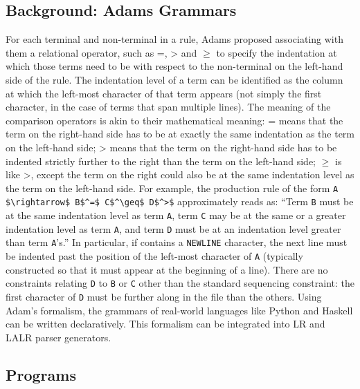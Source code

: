 \subsection{Background: Adams Grammars}
For each terminal and non-terminal in a rule, Adams proposed associating with them a relational operator, such as =, > and $\geq$ to specify the indentation at which those terms need to be with respect to the non-terminal on the left-hand side of the rule. The indentation level of a term can be identified as the column at which the left-most character of that term appears (not simply the first character, in the case of terms that span multiple lines). The meaning of the comparison operators is akin to their mathematical meaning: = means that the term on the right-hand side has to be at exactly the same indentation as the term on the left-hand side; >  means that the term on the right-hand side has to be indented strictly further to the right than the term on the left-hand side; $\geq$ is like >, except the term on the right could also be at the same indentation level as the term on the left-hand side. For example, the production rule of the form \lstinline{A $\rightarrow$ B$^=$ C$^\geq$ D$^>$} approximately reads as: ``Term \lstinline{B} must be at the same indentation level as term \lstinline{A}, term \lstinline{C} may be at the same or a greater indentation level as term \lstinline{A}, and term \lstinline{D} must be at an indentation level greater than term \lstinline{A}'s.'' In particular, if  contains a \lstinline{NEWLINE} character, the next line must be indented past the position of the left-most character of \lstinline{A} (typically constructed so that it must appear at the beginning of a line). There are no constraints relating \lstinline{D} to \lstinline{B} or \lstinline{C} other than the standard sequencing constraint: the first character of \lstinline{D} must be further along in the file than the others. Using Adam's formalism, the grammars of real-world languages like Python and Haskell can be written declaratively. This formalism can be integrated into LR and LALR parser generators.

\subsection{Programs}

